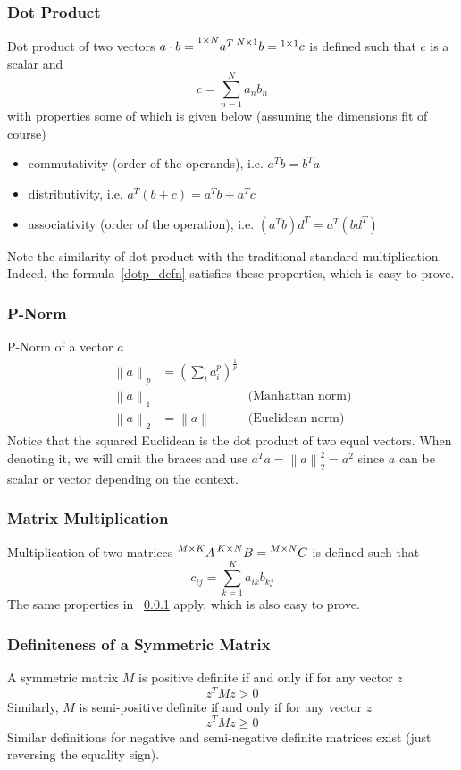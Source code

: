 \documentclass{book}
\newcommand{\norm}[2][]{\left\lVert#2\right\rVert_{#1}}
\numberwithin{equation}{subsection}
\begin{document}
\subsubsection{Dot Product}
\label{dotp}
Dot product of two vectors $a\cdot b=\prescript{1\times N}{}{a^T}\prescript{N\times 1}{}{b}=\prescript{1 \times 1}{}{c}$ is defined such that $c$ is a scalar and
\begin{equation}
    c = \sum_{n=1}^N a_nb_n \label{dotp_defn}
\end{equation}
with properties some of which is given below (assuming the dimensions fit of course)
\begin{itemize}
    \item commutativity (order of the operands), i.e. $a^Tb = b^Ta$
    \item distributivity, i.e. $a^T(b+c) = a^Tb+a^Tc$
    \item associativity (order of the operation), i.e. $(a^Tb)d^T = a^T(bd^T)$
\end{itemize}
Note the similarity of dot product with the traditional standard multiplication. Indeed, the formula~\ref{dotp_defn} satisfies these properties, which is easy to prove.
\subsubsection{P-Norm}
P-Norm of a vector $a$
\begin{align}
    \norm[p]{a} &= (\sum_i a_i^p)^{\frac{1}{p}} &\\
    \norm[1]{a} & & \text{(Manhattan norm)} \label{man_norm}\\
    \norm[2]{a} &= \norm[]{a} & \text{(Euclidean norm)} \label{euc_norm}
\end{align}
Notice that the squared Euclidean is the dot product of two equal vectors. When denoting it, we will omit the braces and use $a^Ta = \norm[2]{a}^2 = a^2$ since $a$ can be scalar or vector depending on the context.
\subsubsection{Matrix Multiplication}
Multiplication of two matrices 
$\prescript{M\times K}{}{A}\prescript{K\times N}{}{B}=\prescript{M\times N}{}{C}$ is defined such that 
\begin{equation}
    c_{ij} = \sum_{k=1}^K a_{ik}b_{kj} 
    \label{matmult}
\end{equation}
The same properties in ~\ref{dotp} apply, which is also easy to prove.
\subsubsection{Definiteness of a Symmetric Matrix} 
A symmetric matrix $M$ is positive definite if and only if for any vector $z$
\begin{equation}
    z^TMz > 0
\end{equation}
Similarly, $M$ is semi-positive definite if and only if for any vector $z$
\begin{equation}
    z^TMz \geq 0
\end{equation}
Similar definitions for negative and semi-negative definite matrices exist (just reversing the equality sign).
\end{document}
